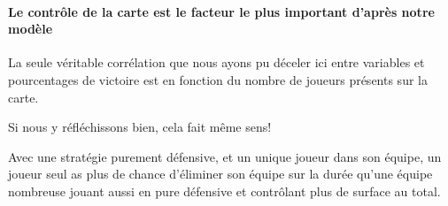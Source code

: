 \paragraph{Le contrôle de la carte est le facteur le plus important d'après notre modèle}
La seule véritable corrélation que nous ayons pu déceler ici entre variables et pourcentages de victoire est en fonction du nombre de joueurs présents sur la carte.

Si nous y réfléchissons bien, cela fait même sens! 

\begin{result}
	Avec une stratégie purement défensive, et un unique joueur dans son équipe, un joueur seul as plus de chance d'éliminer son équipe sur la durée qu'une équipe nombreuse jouant aussi en pure défensive et contrôlant plus de surface au total.
\end{result}

